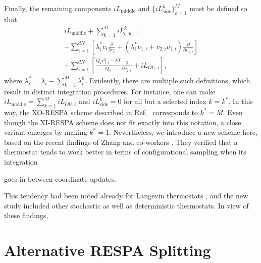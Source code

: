 \documentclass[
    journal=jctcce,
    layout=twocolumn
]{achemso}
\newcommand{\diff}[2]{\frac{\partial #2}{\partial #1}} %
\newcommand{\dof}{i}   %
\newcommand{\Liu}{i\!L}
\begin{document}
Finally, the remaining components $\Liu_\mathrm{middle}$ and $\{\Liu_\mathrm{side}^k\}_{k=1}^M$ must be defined so that
\begin{multline}
\Liu_\mathrm{middle} + \sum_{k=1}^M \Liu_\mathrm{side}^k = \\
- \sum_{\dof=1}^{dN} \left[ \lambda^\ast_\dof v_\dof\diff{v_\dof}{} + \left(\lambda^\ast_\dof v_{1,\dof} + v_{2,\dof} v_{1,\dof}\right)\diff{v_{1,\dof}}{} \right] \\
+ \sum_{\dof=1}^{dN} \left[\tfrac{Q_1 v_{1,\dof}^2 - kT}{Q_2}\diff{v_{2,\dof}}{}
+ \Liu_{OU,\dof} \right],
\end{multline}
where $\lambda^\ast_\dof = \lambda_\dof - \sum_{k=1}^M \lambda^k_\dof$.
Evidently, there are multiple such definitions, which result in distinct integration procedures.
For instance, one can make $\Liu_\mathrm{middle} = \sum_{k=1}^M \Liu_{OU,\dof}$ and $\Liu_\mathrm{side}^k = 0$ for all but a selected index $k = k^\ast$.
In this way, the XO-RESPA scheme described in Ref.~ corresponds to $k^\ast = M$.
Even though the XI-RESPA scheme \cite{Leimkuhler_2013} does not fit exactly into this notation, a close variant emerges by making $k^\ast = 1$.
Nevertheless, we introduce a new scheme here, based on the recent findings of Zhang and co-workers \cite{Zhang_2017}.
They verified that a thermostat tends to work better in terms of configurational sampling when its integration 


goes in-between coordinate updates.


This tendency had been noted already for Langevin thermostats \cite{Leimkuhler_2012, Leimkuhler_2013_2}, and the new study included other stochastic as well as deterministic thermostats.
In view of these findings, 


\section{Alternative RESPA Splitting}
\end{document}
